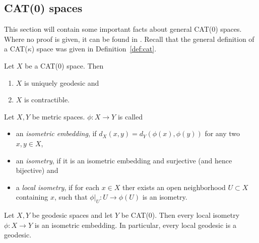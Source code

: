 \subsection{CAT(0) spaces}
\label{sec:cat(0)}

This section will contain some important facts about general CAT(0) spaces. Where no proof is given, it can be found in \cite{MR1744486}. Recall that the general definition of a CAT(\(\kappa\)) space was given in Definition~\ref{def:cat}. 

\begin{prop}[{\cite[Prop II.1.4]{MR1744486}}]
  Let \(X\) be a CAT(0) space. Then
  \begin{enumerate}
  \item \(X\) is uniquely geodesic and
  \item \(X\) is contractible.
  \end{enumerate}
\end{prop}

\begin{defin}
  Let \(X,Y\) be metric spaces. \(\phi \colon X \to Y\) is called
  \begin{itemize}
  \item an \emph{isometric embedding}, if \(d_X(x,y) = d_Y(\phi(x), \phi(y))\) for any two \(x,y \in X\),
  \item an \emph{isometry}, if it is an isometric embedding and surjective (and hence bijective) and
  \item a \emph{local isometry}, if for each \(x \in X\) ther exists an open neighborhood \(U \subset X\) containing \(x\), such that \(\phi|_U \colon U \to \phi(U)\) is an isometry.
  \end{itemize}
\end{defin}

\begin{prop}
  Let \(X,Y\) be geodesic spaces and let \(Y\) be CAT(0). Then every local isometry \(\phi \colon X \to Y\) is an isometric embedding. In particular, every local geodesic is a geodesic.
\end{prop}


